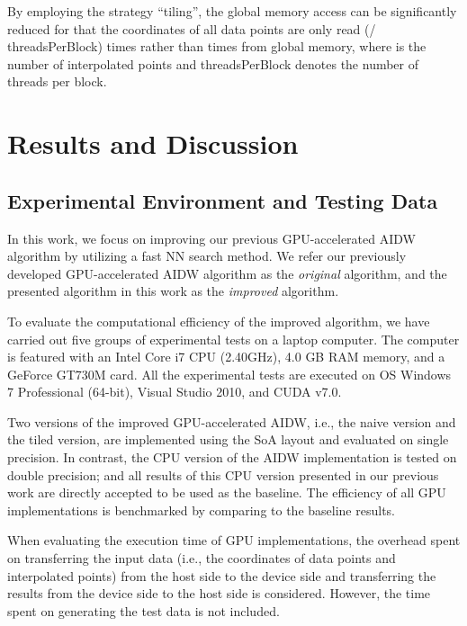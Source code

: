 \documentclass[final,5p,times,twocolumn,authoryear]{elsarticle}
\begin{document}
			By employing the strategy ``tiling'', the global memory access can be 
			significantly reduced for that the coordinates of all data points are only 
			read (/ threadsPerBlock) times rather than  times from global memory, where 
			 is the number of interpolated points and threadsPerBlock denotes the number 
			of threads per block. 

		
			
			\section{Results and Discussion}
			
			\subsection{Experimental Environment and Testing Data }
			In this work, we focus on improving our previous GPU-accelerated AIDW 
			algorithm by utilizing a fast NN search method. We refer our previously 
			developed GPU-accelerated AIDW algorithm as the \textit{original} algorithm, and the 
			presented algorithm in this work as the \textit{improved} algorithm. 
			
			To evaluate the computational efficiency of the improved algorithm, we have 
			carried out five groups of experimental tests on a laptop computer. The 
			computer is featured with an Intel Core i7 CPU (2.40GHz), 4.0 GB RAM memory, 
			and a GeForce GT730M card. All the experimental tests are executed on OS 
			Windows 7 Professional (64-bit), Visual Studio 2010, and CUDA v7.0.
			
			Two versions of the improved GPU-accelerated AIDW, i.e., the naive version 
			and the tiled version, are implemented using the SoA layout and evaluated on 
			single precision. In contrast, the CPU version of the AIDW implementation is 
			tested on double precision; and all results of this CPU version 
			presented in our previous work \citep{29DBLP:journals/corr/MeiXX15} are directly accepted to be used as the 
			baseline. The efficiency of all GPU implementations is benchmarked by 
			comparing to the baseline results.
			
			When evaluating the execution time of GPU implementations, the overhead 
			spent on transferring the input data (i.e., the coordinates of data points 
			and interpolated points) from the host side to the device side and 
			transferring the results from the device side to the host side is 
			considered. However, the time spent on generating the test data is not 
			included. 
			
\end{document}
